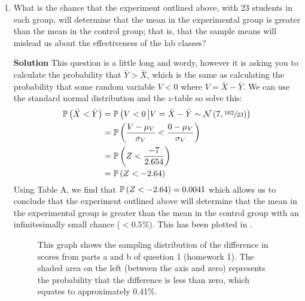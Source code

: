 \begin{enumerate}
\begin{enumerate}
        \item What is the chance that the experiment outlined above, with 23 students in each group, will determine that the mean in the experimental group is greater than the mean in the control group; that is, that the sample means will mislead us about the effectiveness of the lab classes?
        \begin{framed}{\textbf{Solution}}
        This question is a little long and wordy, however it is asking you to calculate the probability that $\bar{Y}>\bar{X}$, which is the same as calculating the probability that some random variable $V<0$ where $V = \bar{X} - \bar{Y}$. We can use the standard normal distribution and the $z$-table so solve this:
        \begin{align}
            \operatorname{\mathbb{P}}{\left( \bar{X}<\bar{Y}\right)} &= \operatorname{\mathbb{P}}{\left( V<0 \left| V = \bar{X} - \bar{Y} \sim \mathcal{N} \left( 7, \sfrac{162}{23}\right) \right) \right. } \\
            &= \operatorname{\mathbb{P}}{\left( \frac{V - \mu_V}{\sigma_V}< \frac{0 - \mu_V}{\sigma_V}\right)} \\
            &= \operatorname{\mathbb{P}}{\left( Z < \frac{-7}{2.654}\right)} \\
            &= \operatorname{\mathbb{P}}{\left( Z<-2.64\right)}
        \end{align}
        Using Table A, we find that $\operatorname{\mathbb{P}}{\left( Z<-2.64\right)} = 0.0041$ which allows us to conclude that the experiment outlined above will determine that the mean in the experimental group is greater than the mean in the control group with an infinitesimally small chance ($<0.5\%$). This has been plotted in .
        \end{framed}
        \FloatBarrier
        \begin{figure}[h]
            \centering
        \caption{This graph shows the sampling distribution of the difference in scores from parts a and b of question 1 (homework 1). The shaded area on the left (between the axis and zero) represents the probability that the difference is less than zero, which equates to approximately 0.41\%.}
        \label{fig:hw1q1d}
        \end{figure}
        \FloatBarrier
    \end{enumerate}
    

\end{enumerate}

